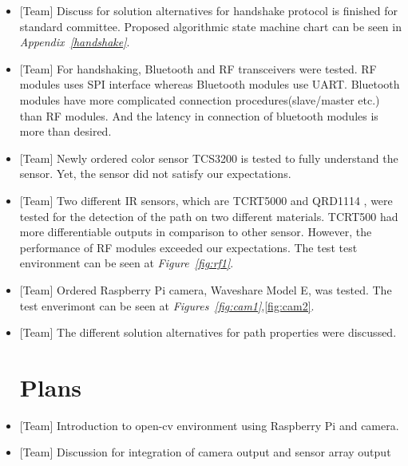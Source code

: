 \documentclass[a4paper,12pt]{article}
\begin{document}
\begin{itemize}
	
	
\item {[Team]} Discuss for solution alternatives for handshake protocol is finished for standard committee. Proposed algorithmic state machine chart can be seen in \textit{Appendix~\ref{handshake}}. \vspace{-.2cm}
 

\item {[Team]} For handshaking, Bluetooth and RF transceivers were tested. RF modules uses SPI interface whereas Bluetooth modules use UART. Bluetooth modules have more complicated connection procedures(slave/master etc.) than RF modules. And the latency in connection of bluetooth modules is more than desired.
	
	
\item {[Team]} Newly ordered color sensor TCS3200 is tested to fully understand the sensor. Yet, the sensor did not satisfy our expectations. \vspace{-.2cm}

\item {[Team]} Two different IR sensors, which are TCRT5000 and QRD1114 , were tested for the detection of the path on two different materials. TCRT500 had more differentiable outputs in comparison to other sensor. However, the performance of RF modules exceeded our expectations. The test test environment can be seen at \textit{Figure~\ref{fig:rf1}}. \vspace{-.2cm}

\item {[Team]} Ordered Raspberry Pi camera, Waveshare Model E, was tested. The test enverimont can be seen at \textit{Figures~\ref{fig:cam1}},\ref{fig:cam2}.  \vspace{-.2cm}
\item  {[Team]} The different solution alternatives for path properties were discussed. \vspace{-.2cm}


\section{Plans}
	\item  {[Team]} Introduction to open-cv environment using Raspberry Pi and camera. \vspace{-.2cm}
	\item  {[Team]} Discussion for integration of camera output and sensor array output\vspace{-.2cm}
	




\end{itemize}
\end{document}
